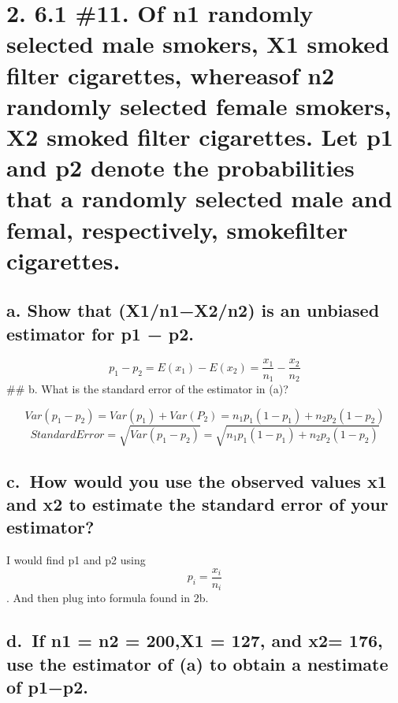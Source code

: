 \documentclass[
]{article}
\begin{document}
\hypertarget{of-n1-randomly-selected-male-smokers-x1-smoked-filter-cigarettes-whereasof-n2-randomly-selected-female-smokers-x2-smoked-filter-cigarettes.-let-p1-and-p2-denote-the-probabilities-that-a-randomly-selected-male-and-femal-respectively-smokefilter-cigarettes.}{%
\section{2. 6.1 \#11. Of n1 randomly selected male smokers, X1 smoked
filter cigarettes, whereasof n2 randomly selected female smokers, X2
smoked filter cigarettes. Let p1 and p2 denote the probabilities that a
randomly selected male and femal, respectively, smokefilter
cigarettes.}\label{of-n1-randomly-selected-male-smokers-x1-smoked-filter-cigarettes-whereasof-n2-randomly-selected-female-smokers-x2-smoked-filter-cigarettes.-let-p1-and-p2-denote-the-probabilities-that-a-randomly-selected-male-and-femal-respectively-smokefilter-cigarettes.}}

\hypertarget{a.-show-that-x1n1x2n2-is-an-unbiased-estimator-for-p1-p2.}{%
\subsection{a. Show that (X1/n1−X2/n2) is an unbiased estimator for p1 −
p2.}\label{a.-show-that-x1n1x2n2-is-an-unbiased-estimator-for-p1-p2.}}

\[
p_1 - p_2 = E(x_1)-E(x_2) = \frac{x_1}{n_1}-\frac{x_2}{n_2}
\] \#\# b. What is the standard error of the estimator in (a)?

\[
Var(p_1-p_2) = Var(p_1)+Var(P_2) = n_1p_1(1-p_1) +n_2p_2(1-p_2)
\] \[
Standard Error =\sqrt{Var(p_1-p_2)} = \sqrt{n_1p_1(1-p_1) +n_2p_2(1-p_2)}
\]

\hypertarget{c.-how-would-you-use-the-observed-values-x1-and-x2-to-estimate-the-standard-error-of-your-estimator}{%
\subsection{c.~How would you use the observed values x1 and x2 to
estimate the standard error of your
estimator?}\label{c.-how-would-you-use-the-observed-values-x1-and-x2-to-estimate-the-standard-error-of-your-estimator}}

I would find p1 and p2 using \[p_i = \frac{x_i}{n_i}\]. And then plug
into formula found in 2b.

\hypertarget{d.-if-n1-n2-200x1-127-and-x2-176-use-the-estimator-of-a-to-obtain-a-nestimate-of-p1p2.}{%
\subsection{d.~If n1 = n2 = 200,X1 = 127, and x2= 176, use the estimator
of (a) to obtain a nestimate of
p1−p2.}\label{d.-if-n1-n2-200x1-127-and-x2-176-use-the-estimator-of-a-to-obtain-a-nestimate-of-p1p2.}}
\end{document}
